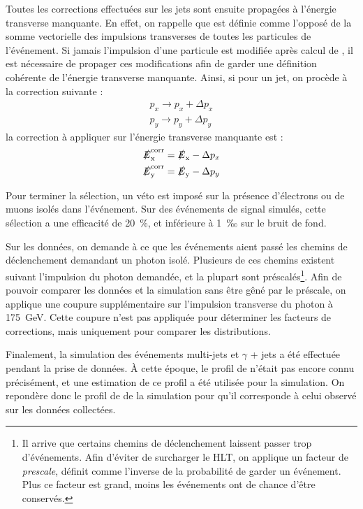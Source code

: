 \label{page:met_propagation} Toutes les corrections effectuées sur les jets sont ensuite propagées à l'énergie transverse manquante. En effet, on rappelle que \met est définie comme l'opposé de la somme vectorielle des impulsions transverses de toutes les particules de l'événement. Si jamais l'impulsion d'une particule est modifiée après calcul de \met, il est nécessaire de propager ces modifications afin de garder une définition cohérente de l'énergie transverse manquante. Ainsi, si pour un jet, on procède à la correction suivante :
\begin{align*}
  p_x \rightarrow p_x + \Delta p_x \\
  p_y \rightarrow p_y + \Delta p_y
\end{align*}
la correction à appliquer sur l'énergie transverse manquante est :
\begin{align*}
  \slashed{E}_{\mathrm{x}}^{\text{corr}} &= \slashed{E}_{\mathrm{x}} - \Delta p_x \\
  \slashed{E}_{\mathrm{y}}^{\text{corr}} &= \slashed{E}_{\mathrm{y}} - \Delta p_y
\end{align*}

Pour terminer la sélection, un véto est imposé sur la présence d'électrons ou de muons isolés dans l'événement. Sur des événements de signal simulés, cette sélection a une efficacité de \tilde \SI{20}{\%}, et inférieure à \tilde\SI{1}{‰} sur le bruit de fond.

\bigskip

Sur les données, on demande à ce que les événements aient passé les chemins de déclenchement demandant un photon isolé. Plusieurs de ces chemins existent suivant l'impulsion du photon demandée, et la plupart sont préscalés\footnote{Il arrive que certains chemins de déclenchement laissent passer trop d'événements. Afin d'éviter de surcharger le HLT, on applique un facteur de \emph{prescale}, définit comme l'inverse de la probabilité de garder un événement. Plus ce facteur est grand, moins les événements ont de chance d'être conservés.}. Afin de pouvoir comparer les données et la simulation sans être gêné par le préscale, on applique une coupure supplémentaire sur l'impulsion transverse du photon à \SI{175}{\GeV}. Cette coupure n'est pas appliquée pour déterminer les facteurs de corrections, mais uniquement pour comparer les distributions.

\smallskip

Finalement, la simulation des événements multi-jets et $\gamma$ + jets a été effectuée pendant la prise de données. À cette époque, le profil de \pu n'était pas encore connu précisément, et une estimation de ce profil a été utilisée pour la simulation. On repondère donc le profil de \pu de la simulation pour qu'il corresponde à celui observé sur les données collectées.

